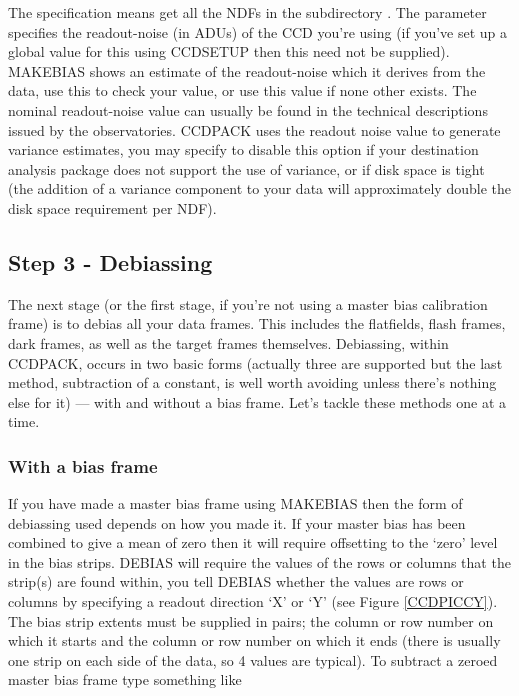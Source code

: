 The  specification  \myverb{[.BIAS]*}  means
get all the NDFs in the subdirectory \myverb{[.BIAS]} .
The  parameter specifies the readout-noise (in ADUs) of
the CCD you're using (if you've set up a global value for this  using
CCDSETUP then this need not be supplied). MAKEBIAS shows an estimate of
the readout-noise which it derives from the data, use this to check your
value, or use this value if none other exists. The nominal readout-noise
value can usually be found in the technical descriptions issued by the
observatories. CCDPACK uses the readout noise value to generate variance
estimates, you may specify  to disable  this option
if your destination analysis package does not support the  use of
variance, or if disk space is tight (the addition of a variance
component to your data will approximately double the disk space
requirement per NDF).

\subsection{Step 3 - Debiassing}

The next stage (or the first stage, if you're not using a master bias
calibration frame) is to debias all your data frames. This includes the
flatfields, flash frames, dark frames, as well as the target frames
themselves. Debiassing, within CCDPACK, occurs in two basic forms
(actually three are supported but the last method, subtraction of a
constant, is well worth avoiding unless there's nothing else for it) ---
with and without a bias frame. Let's tackle these methods one at a time.

\subsubsection{With a bias frame}

If you have made a master bias frame using MAKEBIAS then the form of
debiassing used depends on how you made it. If your master bias
has been combined to give a mean of zero then it will
require offsetting to the `zero' level in the bias strips. DEBIAS will
require the values of the rows or columns that the strip(s) are found
within, you tell DEBIAS whether the values are rows or columns by
specifying a readout direction `X' or `Y' (see Figure \ref{CCDPICCY}).
The bias strip extents must be supplied in pairs; the column or row
number on which it starts and the column or row number on which it ends
(there is usually one strip on each side of the data, so 4 values are
typical). To subtract a zeroed master bias frame type something like

